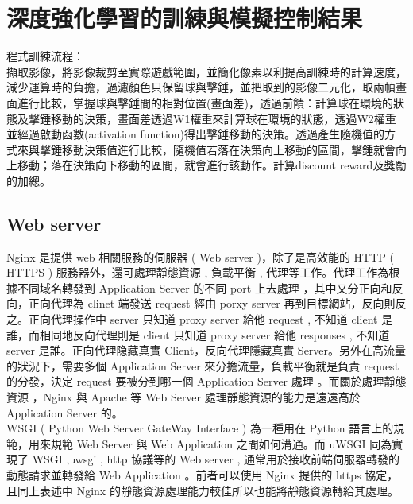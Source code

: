 \documentclass[14pt,a4paper]{report}  %
\begin{document}
\chapter{深度強化學習的訓練與模擬控制結果}
程式訓練流程：\\
 擷取影像，將影像裁剪至實際遊戲範圍，並簡化像素以利提高訓練時的計算速度，減少運算時的負擔，過濾顏色只保留球與擊錘，並把取到的影像二元化，取兩幀畫面進行比較，掌握球與擊錘間的相對位置(畫面差)，透過前饋：計算球在環境的狀態及擊錘移動的決策，畫面差透過W1權重來計算球在環境的狀態，透過W2權重並經過啟動函數(activation function)得出擊錘移動的決策。透過產生隨機值的方式來與擊錘移動決策值進行比較，隨機值若落在決策向上移動的區間，擊錘就會向上移動；落在決策向下移動的區間，就會進行該動作。計算discount reward及獎勵的加總。\\
\section{Web server}
\qquad Nginx 是提供 web 相關服務的伺服器 ( Web server )，除了是高效能的 HTTP ( HTTPS ) 服務器外，還可處理靜態資源 , 負載平衡 , 代理等工作。代理工作為根據不同域名轉發到 Application Server 的不同 port 上去處理 ，其中又分正向和反向，正向代理為 clinet 端發送 request 經由 porxy server 再到目標網站，反向則反之。正向代理操作中 server 只知道 proxy server  給他 request , 不知道 client 是誰，而相同地反向代理則是 client 只知道 proxy server 給他 responses , 不知道 server 是誰。正向代理隐藏真實 Client，反向代理隱藏真實 Server。另外在高流量的狀況下，需要多個 Application Server 來分擔流量，負載平衡就是負責 request 的分發，決定 request 要被分到哪一個 Application Server 處理 。而關於處理靜態資源 ，Nginx 與 Apache 等 Web Server 處理靜態資源的能力是遠遠高於 Application Server 的。\\
\qquad WSGI ( Python Web Server GateWay Interface ) 為一種用在 Python 語言上的規範，用來規範 Web Server 與 Web Application 之間如何溝通。而 uWSGI 同為實現了 WSGI ,uwsgi , http 協議等的 Web server , 通常用於接收前端伺服器轉發的動態請求並轉發給 Web Application 。前者可以使用 Nginx 提供的 https 協定，且同上表述中 Nginx 的靜態資源處理能力較佳所以也能將靜態資源轉給其處理。\\
\newpage
\end{document}
